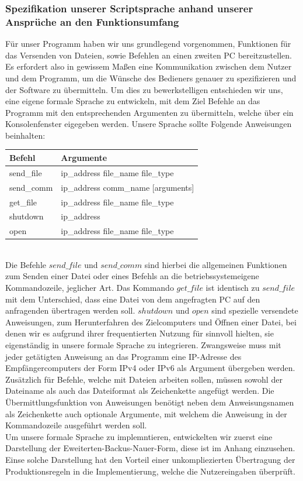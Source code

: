 \documentclass[12pt, a4paper]{scrartcl}
\begin{document}
\subsubsection{Spezifikation unserer Scriptsprache anhand unserer Ansprüche an den Funktionsumfang}
Für unser Programm haben wir uns grundlegend vorgenommen, Funktionen für das Versenden von Dateien, sowie Befehlen an einen zweiten PC bereitzustellen. Es erfordert also in gewissem Maßen eine Kommunikation zwischen dem Nutzer und dem Programm, um die Wünsche des Bedieners genauer zu spezifizieren und der Software zu übermitteln. Um dies zu bewerkstelligen entschieden wir uns, eine eigene formale Sprache zu entwickeln, mit dem Ziel Befehle an das Programm mit den entsprechenden Argumenten zu übermitteln, welche über ein Konsolenfenster eigegeben werden.
Unsere Sprache sollte Folgende Anweisungen beinhalten:\\
\begin{table}[h!]
\centering
\begin{tabular}{|ll|}
\hline
Befehl & Argumente \\ \hline
send\_file & ip\_address file\_name file\_type \\
send\_comm & ip\_address comm\_name {[}arguments{]} \\
get\_file & ip\_address file\_name file\_type \\
shutdown & ip\_address \\
open & ip\_address file\_name file\_type \\ \hline
\end{tabular}
\end{table}\\
Die Befehle $send\_file$ und $send\_comm$ sind hierbei die allgemeinen Funktionen zum Senden einer Datei oder eines Befehls an die betriebssystemeigene Kommandozeile, jeglicher Art. Das Kommando $get\_file$ ist identisch zu $send\_file$ mit dem Unterschied, dass eine Datei von dem angefragten PC auf den anfragenden übertragen werden soll.
$shutdown$ und $open$ sind spezielle versendete Anweisungen, zum Herunterfahren des Zielcomputers und Öffnen einer Datei, bei denen wir es aufgrund ihrer frequentierten Nutzung für sinnvoll hielten, sie eigenständig in unsere formale Sprache zu integrieren. Zwangsweise muss mit jeder getätigten Anweisung an das Programm eine IP-Adresse des Empfängercomputers der Form IPv4 oder IPv6 als Argument übergeben werden. Zusätzlich für Befehle, welche mit Dateien arbeiten sollen, müssen sowohl der Dateiname als auch das Dateiformat als Zeichenkette angefügt werden. Die Übermittlungsfunktion von Anweisungen benötigt neben dem Anweisungsnamen als Zeichenkette auch optionale Argumente, mit welchem die Anweisung in der Kommandozeile ausgeführt werden soll.\\
Um unsere formale Sprache zu implemntieren, entwickelten wir zuerst eine Darstellung der Eweiterten-Backus-Nauer-Form, diese ist im Anhang einzusehen. Einse solche Darstellung hat den Vorteil einer unkompliezierten Übertragung der Produktionsregeln in die Implementierung, welche die Nutzereingaben überprüft.
\end{document}
